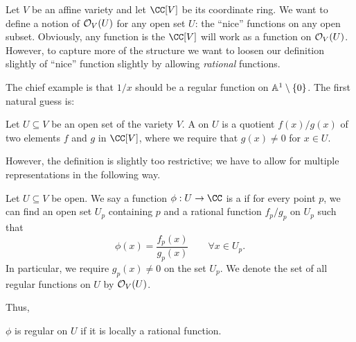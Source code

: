 Let $V$ be an affine variety and let $\CC[V]$ be its coordinate ring.
We want to define a notion of $\mathcal O_V(U)$ for any open set $U$:
the ``nice'' functions on any open subset.
Obviously, any function is the $\CC[V]$ will work as a function on $\mathcal O_V(U)$.
However, to capture more of the structure we want to
loosen our definition slightly of ``nice'' function slightly
by allowing \emph{rational} functions.

The chief example is that $1/x$ should be a regular function
on $\mathbb A^1 \setminus \{0\}$.
The first natural guess is:
\begin{definition}
	Let $U \subseteq V$ be an open set of the variety $V$.
	A  on $U$
	is a quotient $f(x) / g(x)$ of two elements $f$ and $g$ in $\CC[V]$,
	where we require that $g(x) \neq 0$ for $x \in U$.
\end{definition}
However, the definition is slightly too restrictive;
we have to allow for multiple representations in the following way.
\begin{definition}
	Let $U \subseteq V$ be open.
	We say a function $\phi : U \to \CC$ is a  if
	for every point $p$, we can find an open set $U_p$ containing $p$
	and a rational function $f_p/g_p$ on $U_p$ such that
	\[ \phi(x) = \frac{f_p(x)}{g_p(x)} \qquad \forall x \in U_p. \]
	In particular, we require $g_p(x) \neq 0$ on the set $U_p$.
	We denote the set of all regular functions on $U$ by $\mathcal O_V(U)$.
\end{definition}

Thus,
\begin{moral}
	$\phi$ is regular on $U$ if it is locally a rational function.
\end{moral}

